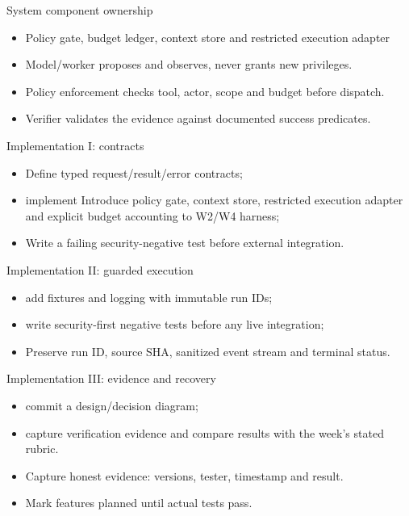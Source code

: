 \documentclass[aspectratio=169,10pt]{beamer}
\begin{document}
\begin{frame}{System component ownership}
\small
\begin{itemize}
\item Policy gate, budget ledger, context store and restricted execution adapter
\item Model/worker proposes and observes, never grants new privileges.
\item Policy enforcement checks tool, actor, scope and budget before dispatch.
\item Verifier validates the evidence against documented success predicates.
\end{itemize}

\end{frame}

\begin{frame}{Implementation I: contracts}
\small
\begin{itemize}
\item Define typed request/result/error contracts;
\item implement Introduce policy gate, context store, restricted execution adapter and explicit budget accounting to W2/W4 harness;
\item Write a failing security-negative test before external integration.
\end{itemize}

\end{frame}

\begin{frame}{Implementation II: guarded execution}
\small
\begin{itemize}
\item add fixtures and logging with immutable run IDs;
\item write security-first negative tests before any live integration;
\item Preserve run ID, source SHA, sanitized event stream and terminal status.
\end{itemize}

\end{frame}

\begin{frame}{Implementation III: evidence and recovery}
\small
\begin{itemize}
\item commit a design/decision diagram;
\item capture verification evidence and compare results with the week's stated rubric.
\item Capture honest evidence: versions, tester, timestamp and result.
\item Mark features planned until actual tests pass.
\end{itemize}

\end{frame}
\end{document}
